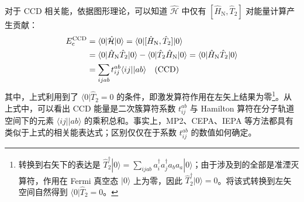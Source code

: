 对于 CCD 相关能，依据图形理论，可以知道 $\hat{\mathcal{H}}$ 中仅有 $[\hat H_\mathrm{N}, \hat T_2]$ 对能量计算产生贡献：
\begin{align}
  \label{eq.2.ccd-corr-energy}
  E_\mathrm{c}^\mathrm{CCD} &= \langle 0 | \hat{\mathcal{H}} | 0 \rangle = \langle 0 | [\hat H_\mathrm{N}, \hat T_2] | 0 \rangle \notag\\
  &= \langle 0 | \hat H_\mathrm{N} \hat T_2 | 0 \rangle - \langle 0 | \hat T_2 \hat H_\mathrm{N} | 0 \rangle = \langle 0 | \hat H_\mathrm{N} \hat T_2 | 0 \rangle \notag\\
  &= \sum_{ijab} t_{ij}^{ab} \langle ij || ab \rangle \quad \text{(CCD)}
\end{align}
其中，上式利用到了 $\langle 0 | \hat T_2 = 0$ 的条件，即激发算符作用在左矢上结果为零\footnote{转换到右矢下的表达是 $\hat T_2^\dagger | 0 \rangle = \sum_{ijab} a_i^\dagger a_j^\dagger a_b a_a | 0 \rangle$；由于涉及到的全部是准湮灭算符，作用在 Fermi 真空态 $| 0 \rangle$ 上为零，因此 $\hat T_2^\dagger | 0 \rangle = 0$。将该式转换到左矢空间自然得到 $\langle 0 | \hat T_2 = 0$。}。从上式中，可以看出 CCD 能量是二次簇算符系数 $t_{ij}^{ab}$ 与 Hamilton 算符在分子轨道空间下的元素 $\langle ij || ab \rangle$ 的乘积总和。事实上，MP2、CEPA、IEPA 等方法都具有类似于上式的相关能表达式；区别仅仅在于系数 $t_{ij}^{ab}$ 的数值如何确定。


